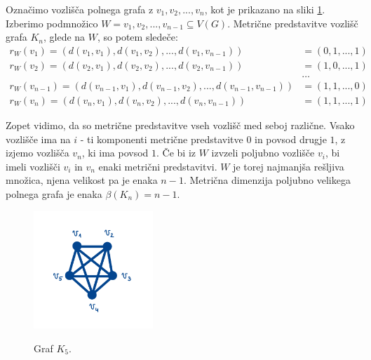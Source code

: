 \documentclass[mat1, tisk]{fmfdelo}
\newcommand{\1}{(1, 1, ..., 1)}
\newcommand{\2}{(2, 2, ..., 2)}
\begin{document}
\begin{primer}\label{pr:dim_poln}
    Označimo vozlišča polnega grafa z $v_1, v_2, ..., v_n$, kot je prikazano na sliki \ref{fig:polni}. 
    Izberimo podmnožico $W = {v_1, v_2, ... , v_{n-1}} \subseteq V(G).$ 
    Metrične predstavitve vozlišč grafa $K_n$, glede na $W$, so potem sledeče:
    \begin{align*}
        r_W(v_1) = (d(v_1, v_1), d(v_1, v_2), ... , d(v_1, v_{n-1})) & = (0, 1, ... , 1) \\
        r_W(v_2) = (d(v_2, v_1), d(v_2, v_2), ... , d(v_2, v_{n-1})) & = (1, 0, ... , 1) \\
        & \dots \\
        r_W(v_{n-1}) = (d(v_{n-1}, v_1), d(v_{n-1}, v_2), ... , d(v_{n-1}, v_{n-1})) & = (1, 1, ... , 0) \\
        r_W(v_n) = (d(v_n, v_1), d(v_n, v_2), ... ,  d(v_n, v_{n-1})) & = (1, 1, ... , 1)
    \end{align*}
    
    Zopet vidimo, da so metrične predstavitve vseh vozlišč med seboj različne. Vsako 
    vozlišče ima na $i$ - ti komponenti metrične predstavitve $0$ in povsod drugje $1$, 
    z izjemo vozlišča $v_n$, ki ima povsod $1$. Če bi iz $W$ izvzeli poljubno vozlišče $v_i$, 
    bi imeli vozlišči $v_i$ in $v_n$ enaki metrični predstavitvi. $W$  je torej najmanjša rešljiva množica, 
    njena velikost pa je enaka $n-1$. Metrična dimenzija poljubno velikega polnega grafa je enaka 
    $\beta(K_n) = n-1.$

    \begin{figure}[h]
        \centering
        \includegraphics[width=0.4\textwidth]{IMG_polni.jpg}
        \label{fig:polni}
        \caption{Graf $K_5$.}
    \end{figure}

\end{primer}

\end{document}

